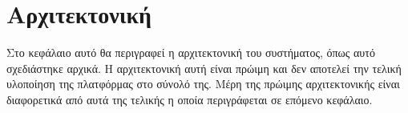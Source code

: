 \section{Αρχιτεκτονική} \label{section:3-7-architecture-design}

Στο κεφάλαιο αυτό θα περιγραφεί η αρχιτεκτονική του συστήματος, όπως αυτό σχεδιάστηκε αρχικά. Η αρχιτεκτονική αυτή είναι πρώιμη και δεν αποτελεί την τελική υλοποίηση της πλατφόρμας στο σύνολό της. Μέρη της πρώιμης αρχιτεκτονικής είναι διαφορετικά από αυτά της τελικής η οποία περιγράφεται σε επόμενο κεφάλαιο.
